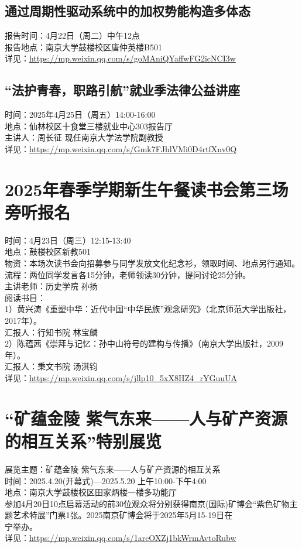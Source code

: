 \documentclass[letterpaper, 12pt]{article}
\begin{document}
\begin{multicols}{2}
\subsection{通过周期性驱动系统中的加权势能构造多体态} %
报告时间：4月22日（周二）中午12点
\\报告地点：南京大学鼓楼校区唐仲英楼B501
\\详见：\url{https://mp.weixin.qq.com/s/goMAniQYaffwFG2icNCI3w}

\subsection{“法护青春，职路引航”就业季法律公益讲座} %
时间：2025年4月25日（周五）14:00-16:00
\\地点：仙林校区十食堂三楼就业中心303报告厅
\\主讲人：周长征 现任南京大学法学院副教授
\\详见：\url{https://mp.weixin.qq.com/s/Gmk7FJhlVMi0D4rtfXnv0Q}



\section{2025年春季学期新生午餐读书会第三场旁听报名} %
时间：4月23日（周三）12:15-13:40
\\地点：鼓楼校区新教501
\\物资：本场次读书会向招募参与同学发放文化纪念衫，领取时间、地点另行通知。
\\流程：两位同学发言各15分钟，老师领读30分钟，提问讨论25分钟。
\\主讲老师：历史学院 孙扬
\\阅读书目：
\\1）黄兴涛《重塑中华：近代中国“中华民族”观念研究》（北京师范大学出版社，2017年）。
\\汇报人：行知书院 林宝麟
\\2）陈蕴茜《崇拜与记忆：孙中山符号的建构与传播》（南京大学出版社，2009年）。
\\汇报人：秉文书院 汤淇钧
\\详见：\url{https://mp.weixin.qq.com/s/jllp10_5xX8HZ4_rYGuuUA}

\section{“矿蕴金陵 紫气东来——人与矿产资源的相互关系”特别展览} %
展览主题：矿蕴金陵 紫气东来——人与矿产资源的相互关系
\\时间：2025.4.20(开幕式)—2025.5.20 上午10:00-下午4:00
\\地点：南京大学鼓楼校区田家炳楼一楼多功能厅
\\参加4月20日10点启幕活动的前30位观众将分别获得南京(国际)矿博会“紫色矿物主题艺术特展”门票1张。2025南京矿博会将于2025年5月15-19日在
\\宁举办。
\\详见：\url{https://mp.weixin.qq.com/s/1arcOXZj1bkWrmAvtoRubw}


\end{multicols}
\end{document}
